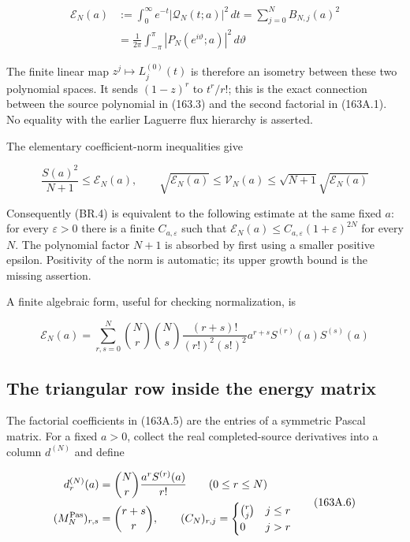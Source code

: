 \documentclass[
  11pt,
]{book}
\begin{document}
\[
\boxed{\begin{aligned}
\mathscr E_N(a)&:=\int_0^\infty e^{-t}|\mathcal Q_N(t;a)|^2\,dt
=\sum_{j=0}^N B_{N,j}(a)^2\\
&=\frac1{2\pi}\int_{-\pi}^{\pi}|P_N(e^{i\vartheta};a)|^2\,d\vartheta
\end{aligned}}
\tag{163A.3}
\]

The finite linear map \(z^j\mapsto L_j^{(0)}(t)\) is therefore an
isometry between these two polynomial spaces. It sends \((1-z)^r\) to
\(t^r/r!\); this is the exact connection between the source polynomial
in (163.3) and the second factorial in (163A.1). No equality with the
earlier Laguerre flux hierarchy is asserted.

The elementary coefficient-norm inequalities give

\[
\frac{S(a)^2}{N+1}\le\mathscr E_N(a),\qquad
\sqrt{\mathscr E_N(a)}\le\mathcal V_N(a)
\le\sqrt{N+1}\sqrt{\mathscr E_N(a)}
\tag{163A.4}
\]

Consequently (BR.4) is equivalent to the following estimate at the same
fixed \(a\): for every \(\varepsilon>0\) there is a finite
\(C_{a,\varepsilon}\) such that
\(\mathscr E_N(a)\le C_{a,\varepsilon}(1+\varepsilon)^{2N}\) for every
\(N\). The polynomial factor \(N+1\) is absorbed by first using a
smaller positive epsilon. Positivity of the norm is automatic; its upper
growth bound is the missing assertion.

A finite algebraic form, useful for checking normalization, is

\[
\mathscr E_N(a)=\sum_{r,s=0}^N\binom Nr\binom Ns
\frac{(r+s)!}{(r!)^2(s!)^2}
a^{r+s}S^{(r)}(a)S^{(s)}(a)
\tag{163A.5}
\]

\subsection{The triangular row inside the energy
matrix}\label{the-triangular-row-inside-the-energy-matrix}

The factorial coefficients in (163A.5) are the entries of a symmetric
Pascal matrix. For a fixed \(a>0\), collect the real completed-source
derivatives into a column \(d^{(N)}\) and define

\[
\begin{aligned}
d_r^{(N)}(a)&=\binom Nr\frac{a^rS^{(r)}(a)}{r!}
\qquad(0\le r\le N)\\
(M_N^{\rm Pas})_{r,s}&=\binom{r+s}{r},\qquad
(C_N)_{r,j}=\begin{cases}\binom rj&j\le r\\0&j>r\end{cases}
\end{aligned}
\tag{163A.6}
\]
\end{document}
